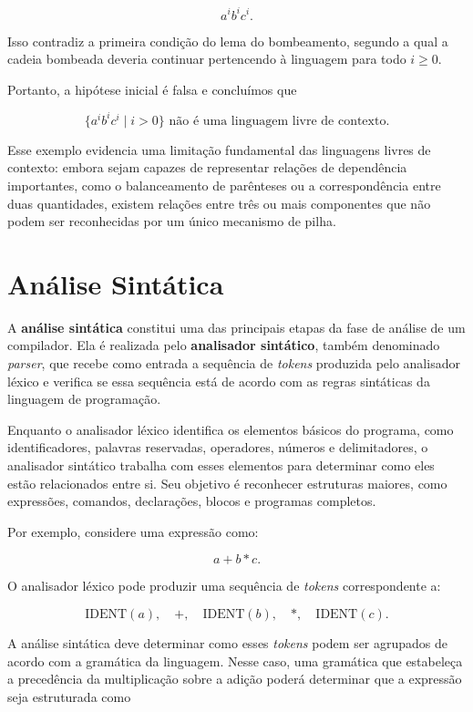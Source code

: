 \documentclass[
  brazilian,
  letterpaper,
]{book}
\theoremstyle{plain}
\theoremstyle{definition}
\theoremstyle{remark}
\begin{document}
\[
a^ib^ic^i.
\]

Isso contradiz a primeira condição do lema do bombeamento, segundo a
qual a cadeia bombeada deveria continuar pertencendo à linguagem para
todo \(i\geq0\).

Portanto, a hipótese inicial é falsa e concluímos que

\[
\boxed{\{a^ib^ic^i\mid i>0\}\text{ não é uma linguagem livre de contexto}.}
\]

Esse exemplo evidencia uma limitação fundamental das linguagens livres
de contexto: embora sejam capazes de representar relações de dependência
importantes, como o balanceamento de parênteses ou a correspondência
entre duas quantidades, existem relações entre três ou mais componentes
que não podem ser reconhecidas por um único mecanismo de pilha.

\section{Análise Sintática}\label{anuxe1lise-sintuxe1tica-1}

A \textbf{análise sintática} constitui uma das principais etapas da fase
de análise de um compilador. Ela é realizada pelo \textbf{analisador
sintático}, também denominado \emph{parser}, que recebe como entrada a
sequência de \emph{tokens} produzida pelo analisador léxico e verifica
se essa sequência está de acordo com as regras sintáticas da linguagem
de programação.

Enquanto o analisador léxico identifica os elementos básicos do
programa, como identificadores, palavras reservadas, operadores, números
e delimitadores, o analisador sintático trabalha com esses elementos
para determinar como eles estão relacionados entre si. Seu objetivo é
reconhecer estruturas maiores, como expressões, comandos, declarações,
blocos e programas completos.

Por exemplo, considere uma expressão como:

\[
a+b*c.
\]

O analisador léxico pode produzir uma sequência de \emph{tokens}
correspondente a:

\[
\text{IDENT}(a),\quad +,\quad \text{IDENT}(b),\quad *,\quad \text{IDENT}(c).
\]

A análise sintática deve determinar como esses \emph{tokens} podem ser
agrupados de acordo com a gramática da linguagem. Nesse caso, uma
gramática que estabeleça a precedência da multiplicação sobre a adição
poderá determinar que a expressão seja estruturada como
\end{document}
